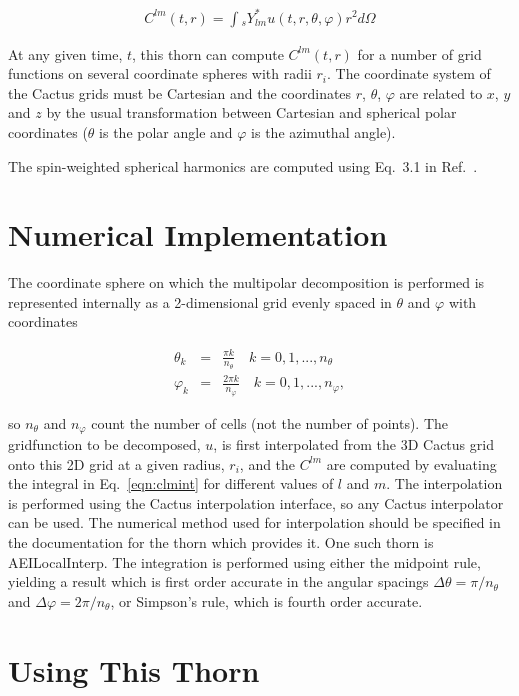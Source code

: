 \documentclass{article}
\begin{document}
\begin{eqnarray}
C^{lm}(t, r) = \int {}_s Y_{lm}^* u(t, r, \theta, \varphi) r^2 d \Omega \label{eqn:clmint}
\end{eqnarray}

At any given time, $t$, this thorn can compute $C^{lm}(t,r)$ for a
number of grid functions on several coordinate spheres with radii $r_i$.
The coordinate system of the Cactus grids must be Cartesian and the
coordinates $r$, $\theta$, $\varphi$ are related to $x$, $y$ and $z$
by the usual transformation between Cartesian and spherical polar
coordinates ($\theta$ is the polar angle and $\varphi$ is the
azimuthal angle).

The spin-weighted spherical harmonics are computed using Eq.~3.1 in
Ref.~\cite{Goldberg:1966uu}.

\section{Numerical Implementation}

The coordinate sphere on which the multipolar decomposition is
performed is represented internally as a 2-dimensional grid evenly
spaced in $\theta$ and $\varphi$ with coordinates

\begin{eqnarray}
\theta_k &=& \frac{\pi k}{n_\theta} \quad k = 0, 1, ..., n_\theta \\
\varphi_k &=& \frac{2\pi k}{n_\varphi} \quad k = 0, 1, ..., n_\varphi,
\end{eqnarray}

so $n_\theta$ and $n_\varphi$ count the number of cells (not the
number of points).  The gridfunction to be decomposed, $u$, is first
interpolated from the 3D Cactus grid onto this 2D grid at a given
radius, $r_i$, and the $C^{lm}$ are computed by evaluating the integral
in Eq.~\ref{eqn:clmint} for different values of $l$ and $m$.  The
interpolation is performed using the Cactus interpolation interface,
so any Cactus interpolator can be used.  The numerical method used for
interpolation should be specified in the documentation for the thorn
which provides it.  One such thorn is AEILocalInterp.  The integration
is performed using either the midpoint rule, yielding a result which
is first order accurate in the angular spacings $\Delta \theta =
\pi/n_\theta$ and $\Delta \varphi = 2\pi/n_\theta$, or Simpson's rule,
which is fourth order accurate.

\section{Using This Thorn}
\end{document}
